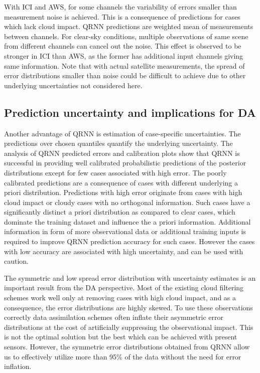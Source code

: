 \documentclass[amt, manuscript]{copernicus}
\begin{document}
With ICI and AWS, for some channels the variability of errors smaller than measurement noise is achieved. This is a consequence of predictions for cases which lack cloud impact. QRNN predictions are weighted mean of measurements between channels. For clear-sky conditions, multiple observations of same scene from different channels can cancel out the noise. This effect is observed to be stronger in ICI than AWS, as the former has additional input channels giving same information. Note that with actual satellite measurements, the spread of error distributions smaller than noise could be difficult to achieve due to other underlying uncertainties not considered here. 


\subsection{Prediction uncertainty and implications for DA}

Another advantage of QRNN is estimation of case-specific uncertainties. The predictions over chosen quantiles quantify the underlying uncertainty. The analysis of QRNN predicted errors and calibration plots show that QRNN is successful in providing well calibrated probabilistic predictions of the posterior distributions except for few cases associated with high error. The poorly calibrated predictions are a consequence of cases with different underlying a priori distribution. Predictions with high error originate from cases with high cloud impact or cloudy cases with no orthogonal information. Such cases have a significantly distinct a priori distribution as compared to clear cases, which dominate the training dataset and influence the a priori information. Additional information in form of more observational data or additional training inputs is required to improve QRNN prediction accuracy for such cases. However the cases with low accuracy are associated with high uncertainty, and can be used with caution.  


The symmetric and low spread error distribution with uncertainty estimates is an important result from the DA perspective. Most of the existing cloud filtering schemes work well only at removing cases with high cloud impact, and as a consequence, the error distributions are highly skewed. To use these observations correctly data assimilation schemes often inflate their asymmetric error distributions at the cost of artificially suppressing the observational impact. This is not the optimal solution but the best which can be achieved with present sensors. However, the symmetric error distributions obtained from QRNN allow us to effectively utilize more than 95\% of the data without the need for error inflation. 
\end{document}
